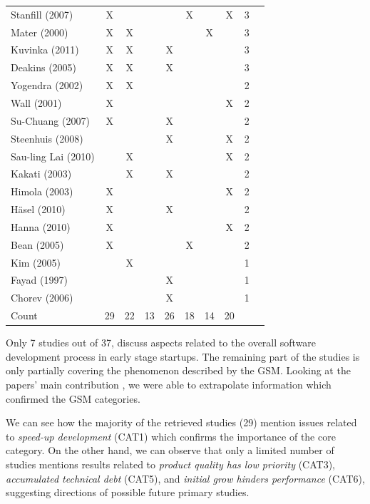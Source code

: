 \documentclass[10pt,journal,letterpaper,compsoc]{IEEEtran}
\begin{document}
\begin{table}[!t]
\begin{tabular}{|l||c||c||c||c||c||c||c||c||c|}
Stanfill (2007) & X &  &  &  & X &  & X & 3 & \cite{Stanfill2007} \\
Mater (2000) & X & X &  &  &  & X &  & 3 & \cite{Mater2000} \\
Kuvinka (2011) & X & X &  & X &  &  &  & 3 & \cite{Kuvinka2011} \\
Deakins (2005) & X & X &  & X &  &  &  & 3 & \cite{Deakins2005} \\
Yogendra (2002) & X & X &  &  &  &  &  & 2 & \cite{Yogendra2002} \\
Wall (2001) & X &  &  &  &  &  & X & 2 & \cite{Wall2001} \\
Su-Chuang (2007) & X &  &  & X &  &  &  & 2 & \cite{Su-Chan2007} \\
Steenhuis (2008) &  &  &  & X &  &  & X & 2 & \cite{Steenhuis2008} \\
Sau-ling Lai (2010) &  & X &  &  &  &  & X & 2 & \cite{Lai2010} \\
Kakati (2003) &  & X &  & X &  &  &  & 2 & \cite{Kakati2003} \\
Himola (2003) & X &  &  &  &  &  & X & 2 & \cite{Hilmola2003} \\
H\"{a}sel (2010) & X &  &  & X &  &  &  & 2 & \cite{Hasel2010} \\
Hanna (2010) & X &  &  &  &  &  & X  & 2 & \cite{Hanna2010} \\
Bean (2005) & X &  &  &  & X &  &  & 2 & \cite{Bean2005} \\
Kim (2005) &  & X &  &  &  &  &  & 1 & \cite{Kim2005} \\
Fayad (1997) &  &  &  & X &  &  &  & 1 & \cite{Fayad1997} \\
Chorev (2006) &  &  &  & X &  &  &  & 1 & \cite{Chorev2006} \\
\hline
Count & 29 & 22 & 13 & 26 & 18 & 14 & 20 & &\\
\hline
\end{tabular}
\end{table}
 
Only 7 studies out of 37, discuss aspects related to the overall software 
development process in early stage startups. The remaining part of the studies 
is only partially covering the phenomenon described by the GSM. Looking at the 
papers' main contribution %
, we were able to extrapolate information which confirmed the GSM categories.

We can see how the majority of the retrieved studies (29) mention issues 
related to \textit{speed-up development} (CAT1) which confirms the importance of 
the core category. On the other hand, we can observe that only a limited number 
of studies mentions results related to \textit{product quality has low priority} 
(CAT3), \textit{accumulated technical debt} (CAT5), and \textit{initial grow 
hinders performance} (CAT6), suggesting directions of possible future primary 
studies.
\end{document}
